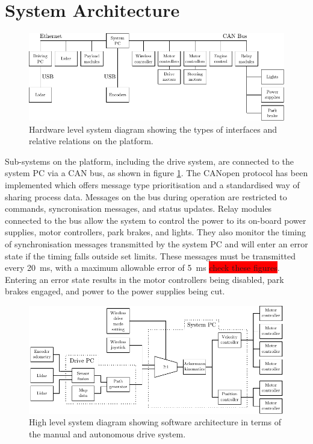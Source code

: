 \documentclass[preprint,authoryear,12pt]{elsarticle}
\begin{document}
\section{System Architecture}
\label{sect:hardware}

    \newcommand{\rpm}{\raisebox{.2ex}{$\scriptstyle\pm$}}
    
    \begin{figure}[htb]
        \centering
        \includegraphics[width=\linewidth]{imgs/system_diagram/diagram_v3.pdf}
        \caption{Hardware level system diagram showing the types of interfaces and relative relations on the platform.}
        \label{fig:system_diagram}
    \end{figure}
    Sub-systems on the platform, including the drive system, are connected to the system PC via a CAN bus, as shown in figure \ref{fig:system_diagram}.
    The CANopen protocol has been implemented which offers message type prioritisation and a standardised way of sharing process data.
    Messages on the bus during operation are restricted to commands, syncronisation messages, and status updates.
    Relay modules connected to the bus allow the system to control the power to its on-board power supplies, motor controllers, park brakes, and lights.
    They also monitor the timing of synchronisation messages transmitted by the system PC and will enter an error state if the timing falls outside set limits.
    These messages must be transmitted every \SI{20}{\milli\second}, with a maximum allowable error of \rpm \SI{5}{\milli\second} \colorbox{red}{check these figures}.
    Entering an error state results in the motor controllers being disabled, park brakes engaged, and power to the power supplies being cut.

    \begin{figure}[htb]
        \centering
        \includegraphics[width=\linewidth]{imgs/system_diagram/software.pdf}
        \caption{High level system diagram showing software architecture in terms of the manual and autonomous drive system.}
        \label{fig:system_diagram_software}
    \end{figure}
\end{document}
